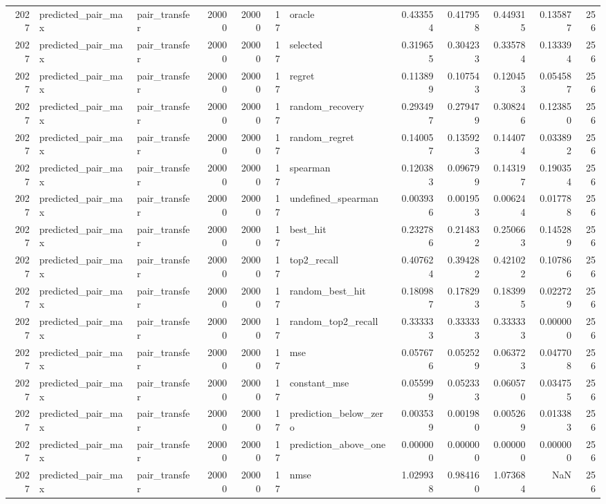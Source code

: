 \begin{tabular}{rllrrrlrrrrr}
2027 & predicted_pair_max & pair_transfer & 20000 & 20000 & 17 & oracle & 0.433554 & 0.417958 & 0.449315 & 0.135877 & 256 \\
2027 & predicted_pair_max & pair_transfer & 20000 & 20000 & 17 & selected & 0.319655 & 0.304233 & 0.335784 & 0.133394 & 256 \\
2027 & predicted_pair_max & pair_transfer & 20000 & 20000 & 17 & regret & 0.113899 & 0.107543 & 0.120453 & 0.054587 & 256 \\
2027 & predicted_pair_max & pair_transfer & 20000 & 20000 & 17 & random_recovery & 0.293497 & 0.279479 & 0.308246 & 0.123850 & 256 \\
2027 & predicted_pair_max & pair_transfer & 20000 & 20000 & 17 & random_regret & 0.140057 & 0.135923 & 0.144074 & 0.033892 & 256 \\
2027 & predicted_pair_max & pair_transfer & 20000 & 20000 & 17 & spearman & 0.120383 & 0.096799 & 0.143197 & 0.190354 & 256 \\
2027 & predicted_pair_max & pair_transfer & 20000 & 20000 & 17 & undefined_spearman & 0.003936 & 0.001953 & 0.006244 & 0.017788 & 256 \\
2027 & predicted_pair_max & pair_transfer & 20000 & 20000 & 17 & best_hit & 0.232786 & 0.214832 & 0.250663 & 0.145289 & 256 \\
2027 & predicted_pair_max & pair_transfer & 20000 & 20000 & 17 & top2_recall & 0.407624 & 0.394282 & 0.421022 & 0.107866 & 256 \\
2027 & predicted_pair_max & pair_transfer & 20000 & 20000 & 17 & random_best_hit & 0.180987 & 0.178293 & 0.183995 & 0.022729 & 256 \\
2027 & predicted_pair_max & pair_transfer & 20000 & 20000 & 17 & random_top2_recall & 0.333333 & 0.333333 & 0.333333 & 0.000000 & 256 \\
2027 & predicted_pair_max & pair_transfer & 20000 & 20000 & 17 & mse & 0.057676 & 0.052529 & 0.063723 & 0.047708 & 256 \\
2027 & predicted_pair_max & pair_transfer & 20000 & 20000 & 17 & constant_mse & 0.055999 & 0.052333 & 0.060570 & 0.034755 & 256 \\
2027 & predicted_pair_max & pair_transfer & 20000 & 20000 & 17 & prediction_below_zero & 0.003539 & 0.001980 & 0.005269 & 0.013383 & 256 \\
2027 & predicted_pair_max & pair_transfer & 20000 & 20000 & 17 & prediction_above_one & 0.000000 & 0.000000 & 0.000000 & 0.000000 & 256 \\
2027 & predicted_pair_max & pair_transfer & 20000 & 20000 & 17 & nmse & 1.029938 & 0.984160 & 1.073684 & NaN & 256 \\

\end{tabular}
